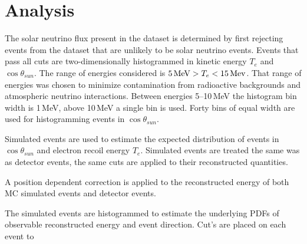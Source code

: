 \section{Analysis}
The solar neutrino flux present in the dataset is determined by first
rejecting events from the dataset that are unlikely to be solar neutrino events.
Events that pass all cuts are two-dimensionally histogrammed in kinetic energy $T_{e}$ and
$\cos\theta_{sun}$.
The range of energies considered is $5\text{\,MeV} > T_{e} < 15\text{\,Mev}$.
That range of energies was chosen to minimize contamination from radioactive
backgrounds and atmospheric neutrino interactions.
Between energies \numrange{5}{10}\,MeV the histogram bin width
is 1\,MeV, above 10\,MeV a single bin is used.
Forty bins of equal width are used for histogramming events in $\cos\theta_{sun}$.

Simulated events are used to estimate the expected distribution of events in
$\cos\theta_{sun}$ and electron recoil energy $T_{e}$.
Simulated events are treated the same was as detector events, the same
cuts are applied to their reconstructed quantities.

A position dependent correction is applied to the reconstructed energy
of both MC simulated events and detector events.


The simulated events are histogrammed to estimate the underlying PDFs
of observable reconstructed energy and event direction. Cut's are placed
on each event to

